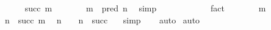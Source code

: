 \begin{isabellebody}
\ \ \ \ \isamarkupfalse%
\ {\isacharparenleft}{\kern0pt}succ\ m{\isacharparenright}{\kern0pt}\isanewline
\ \ \ \ \isamarkupfalse%
\ \isamarkupfalse%
\ {\isachardoublequoteopen}m\ {\isacharequal}{\kern0pt}\ pred\ n{\isachardoublequoteclose}\ \isamarkupfalse%
\ simp\isanewline
\ \ \ \ \isamarkupfalse%
\ \isamarkupfalse%
\ {\isachardoublequoteopen}{\isachardot}{\kern0pt}{\isachardot}{\kern0pt}{\isachardot}{\kern0pt}\ {\isacharequal}{\kern0pt}\ {}{\isachardoublequoteclose}\ \isamarkupfalse%
\ fact\isanewline
\ \ \ \ \isamarkupfalse%
\ \isamarkupfalse%
\ {\isachardoublequoteopen}m\ {\isacharequal}{\kern0pt}\ {}{\isachardoublequoteclose}\ \isacommand{{\isachardot}{\kern0pt}}\isamarkupfalse%
\isanewline
\ \ \ \ \isamarkupfalse%
\ {\isacartoucheopen}n\ {\isacharequal}{\kern0pt}\ succ\ m{\isacartoucheclose}\ \isamarkupfalse%
\ {\isachardoublequoteopen}n\ {\isacharequal}{\kern0pt}\ {}\ {\isasymor}\ n\ {\isacharequal}{\kern0pt}\ succ\ {}{\isachardoublequoteclose}\ \isamarkupfalse%
\ simp\isanewline
\ \ \isamarkupfalse%
\ auto\isanewline
{}\isamarkupfalse%
\ auto%
\endisatagproof
{\isafoldproof}%
%
\isadelimproof
\isanewline
%
\endisadelimproof
\isanewline
%
\isadelimtheory
\isanewline
%
\endisadelimtheory
%
\isatagtheory
{}\isamarkupfalse%
%
\endisatagtheory
{\isafoldtheory}%
%
\isadelimtheory
%
\endisadelimtheory
%
\end{isabellebody}%
\endinput
